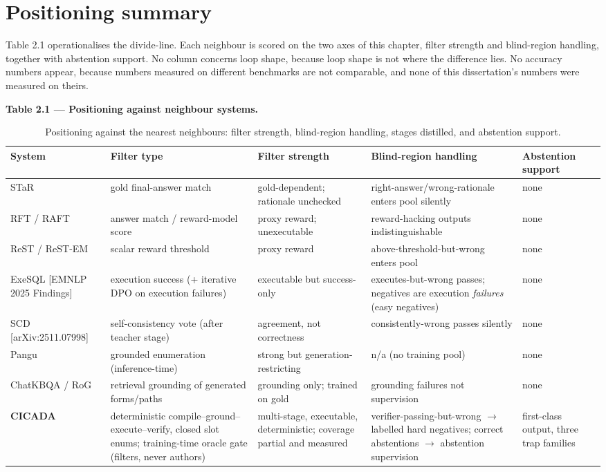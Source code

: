 \documentclass[10pt]{article} %
\begin{document}
\section{Positioning summary}\label{sec:positioning-summary}

Table 2.1 operationalises the divide-line. Each neighbour is scored on the two axes of this chapter, filter strength and blind-region handling, together with abstention support. No column concerns loop shape, because loop shape is not where the difference lies. No accuracy numbers appear, because numbers measured on different benchmarks are not comparable, and none of this dissertation's numbers were measured on theirs.

\textbf{Table 2.1 --- Positioning against neighbour systems.}

\begin{table}[t]
\centering
\small
\caption{Positioning against the nearest neighbours: filter strength, blind-region handling, stages distilled, and abstention support.}
\label{tab:02_background_1}
\begin{tabular}{lllll}
\toprule
System & Filter type & Filter strength & Blind-region handling & Abstention support \\
\midrule
STaR \citep{zelikman2022star} & gold final-answer match & gold-dependent; rationale unchecked & right-answer/wrong-rationale enters pool silently & none \\
RFT / RAFT \citep{yuan2023rft} & answer match / reward-model score & proxy reward; unexecutable & reward-hacking outputs indistinguishable & none \\
ReST / ReST-EM \citep{gulcehre2023rest,singh2024restem} & scalar reward threshold & proxy reward & above-threshold-but-wrong enters pool & none \\
ExeSQL [EMNLP 2025 Findings] & execution success (+ iterative DPO on execution failures) & executable but success-only & executes-but-wrong passes; negatives are execution \emph{failures} (easy negatives) & none \\
SCD [arXiv:2511.07998] & self-consistency vote (after teacher stage) & agreement, not correctness & consistently-wrong passes silently & none \\
Pangu \citep{gu2023pangu} & grounded enumeration (inference-time) & strong but generation-restricting & n/a (no training pool) & none \\
ChatKBQA \citep{luo2024chatkbqa} / RoG \citep{luo2024rog} & retrieval grounding of generated forms/paths & grounding only; trained on gold & grounding failures not supervision & none \\
\textbf{CICADA} & deterministic compile--ground--execute--verify, closed slot enums; training-time oracle gate (filters, never authors) & multi-stage, executable, deterministic; coverage partial and measured & verifier-passing-but-wrong $\rightarrow$ labelled hard negatives; correct abstentions $\rightarrow$ abstention supervision & first-class output, three trap families \\
\bottomrule
\end{tabular}
\end{table}
\end{document}
